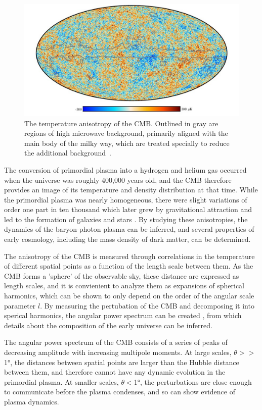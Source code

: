 \begin{figure}[htpb]
	\label{fig:CMB}
	\centering
	\includegraphics[width=1.1\textwidth]{figures/cmb.png}
	\caption[The CMB temperature anisotropy]{The temperature anisotropy of the CMB. Outlined in gray are regions of high microwave background, primarily aligned with the main body of the milky way, which are treated specially to reduce the additional background~\cite{PlanckCMB}.}
\end{figure}

The conversion of primordial plasma into a hydrogen and helium gas occurred when the universe was roughly 400,000 years old, and the CMB therefore provides an image of its temperature and density distribution at that time.
While the primordial plasma was nearly homogeneous, there were slight variations of order one part in ten thousand which later grew by gravitational attraction and led to the formation of galaxies and stars \cite{kurkisuonio}.
By studying these anisotropies, the dynamics of the baryon-photon plasma can be inferred, and several properties of early cosmology, including the mass density of dark matter, can be determined.

The anisotropy of the CMB is measured through correlations in the temperature of different spatial points as a function of the length scale between them. 
As the CMB forms a 'sphere' of the observable sky, these distance are expressed as length scales, and it is convienient to analyze them as expansions of spherical harmonics, which can be shown to only depend on the order of the angular scale parameter $l$. 
By measuring the pertubation of the CMB and decomposing it into sperical harmonics, the angular power spectrum can be created , from which details about the composition of the early universe can be inferred.

The angular power spectrum of the CMB consists of a series of peaks of decreasing amplitude with increasing multipole moments. 
At large scales, $\theta >> $\ang{1}, the distances between spatial points are larger than the Hubble distance between them, and therefore cannot have any dynamic evolution in the primordial plasma.
At smaller scales, $\theta < $\ang{1}, the perturbations are close enough to communicate before the plasma condenses, and so can show evidence of plasma dynamics.

